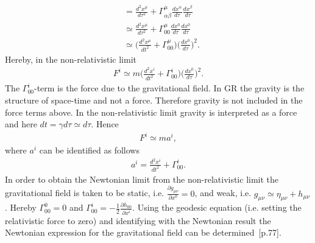 \begin{example}
\begin{equation}
\begin{split}
			&=\frac{d^2x^\mu}{d\tau ^2}+\Gamma^\mu_{\alpha\beta}\frac{dx^\alpha}{d\tau}\frac{dx^\beta}{d\tau}\\
			&\simeq \frac{d^2x^\mu}{d\tau ^2}+\Gamma^\mu_{00}\frac{dx^0}{d\tau}\frac{dx^0}{d\tau}\\
			&\simeq \bigg(\frac{d^2x^\mu}{dt ^2}+\Gamma^\mu_{00}\bigg)\bigg(\frac{dx^0}{d\tau}\bigg)^2.
		\end{split}
	\end{equation}\normalsize
	Hereby, in the non-relativistic limit
	\begin{equation}
		\begin{split}
			F^i\simeq m\bigg(\frac{d^2x^i}{dt ^2}+\Gamma^i_{00}\bigg)\bigg(\frac{dx^0}{d\tau}\bigg)^2.
		\end{split}
	\end{equation}\normalsize
	The $\Gamma^i_{00}$-term is the force due to the gravitational field. In GR the gravity is the structure of space-time and not a force. Therefore gravity is not included in the force terms above. In the non-relativistic limit gravity is interpreted as a force and here $dt=\gamma d\tau \simeq d\tau$. Hence
	\begin{equation}
		\begin{split}
			F^i\simeq m a^i,
		\end{split}
	\end{equation}\normalsize
	where $a^i$ can be identified as follows
	\begin{equation}
		\begin{split}
			a^i=\frac{d^2x^i}{dt ^2}+\Gamma^i_{00}.
		\end{split}
	\end{equation}\normalsize
	In order to obtain the Newtonian limit from the non-relativistic limit the gravitational field is taken to be static, i.e. $\frac{\partial g_{\mu\nu }}{\partial x^0} = 0$, and weak, i.e. $g_{\mu\nu}\simeq\eta_{\mu\nu}+h_{\mu\nu}$. Hereby $\Gamma^0_{00}=0$ and $\Gamma^{i}_{00}=-\frac{1}{2}\frac{\partial h_{00}}{\partial x^i}$. Using the geodesic equation (i.e. setting the relativistic force to zero) and identifying with the Newtonian result the Newtonian expression for the gravitational field can be determined~\citep{Weinberg1972}[p.77].
\end{example}

